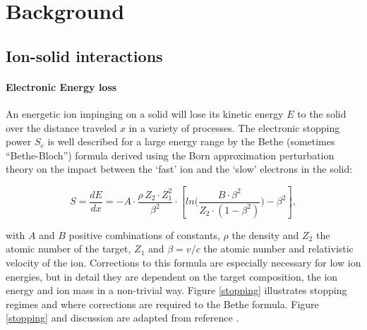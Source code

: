 \chapter{Background}
\label{sec:background}

\section{Ion-solid interactions}
\label{sec:ionsolid}

\subsubsection{Electronic Energy loss}

An energetic ion impinging on a solid will lose its kinetic energy $E$ to the solid over the distance traveled $x$ in a variety of processes. The electronic stopping power $S_e$ is well described for a large energy range by the Bethe (sometimes ``Bethe-Bloch'') formula \cite{bethe_zur_1930,bloch_zur_1933} derived using the Born approximation perturbation theory on the impact between the `fast' ion and the `slow' electrons in the solid: 

\begin{equation}
S = \frac{dE}{dx} = - A \cdot \frac{\rho\,Z_2\cdot Z_1^2}{\beta^2} \cdot \left[ln\Big(\frac{B\cdot\beta^2}{Z_2\cdot(1-\beta^2)}\Big)-\beta^2\right] ,
\end{equation}


with $A$ and $B$ positive combinations of constants, $\rho$ the density and $Z_2$ the atomic number of the target, $Z_1$ and $\beta = v/c$ the atomic number and relativistic velocity of the ion. Corrections to this formula are especially necessary for low ion energies, but in detail they are dependent on the target composition, the ion energy and ion mass in a non-trivial way. Figure \ref{stopping} illustrates stopping regimes and where corrections are required to the Bethe formula. Figure \ref{stopping} and discussion are adapted from reference \cite{sigmund_stopping_2004}.

